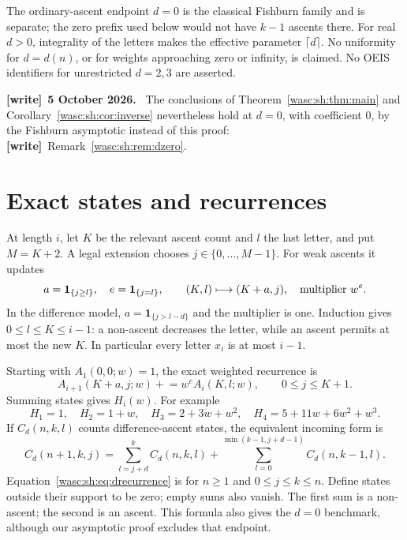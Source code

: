 \documentclass[11pt,a4paper]{article}
\theoremstyle{remark}\newtheorem{remark}[theorem]{Remark}
\newcommand{\ind}{\mathbf 1}\newcommand{\wasc}{\operatorname{wasc}}\newcommand{\dasc}{\operatorname{dasc}}
\numberwithin{equation}{section}
\newenvironment{writenote}[1][]{\par\smallskip\begingroup\small
 \noindent\textbf{[write]}\if\relax\detokenize{#1}\relax\else~\textbf{#1.}\fi\ }%
 {\par\endgroup\smallskip}
\newcommand{\wtag}{\textup{\textbf{[write]}}}
\begin{document}
The ordinary-ascent endpoint $d=0$ is the classical Fishburn family and is separate; the zero prefix used below would not have $k-1$ ascents there. For real $d>0$, integrality of the letters makes the effective parameter $\lceil d\rceil$. No uniformity for $d=d(n)$, or for weights approaching zero or infinity, is claimed. No OEIS identifiers for unrestricted $d=2,3$ are asserted.
\begin{writenote}[5 October 2026]
The conclusions of Theorem~\ref{wasc:sh:thm:main} and Corollary~\ref{wasc:sh:cor:inverse} nevertheless hold at $d=0$, with coefficient $0$, by the Fishburn asymptotic instead of this proof: \wtag\ Remark~\ref{wasc:sh:rem:dzero}.
\end{writenote}

\section{Exact states and recurrences}\label{wasc:sh:sec:states}
At length $i$, let $K$ be the relevant ascent count and $l$ the last letter, and put $M=K+2$. A legal extension chooses $j\in\{0,\ldots,M-1\}$. For weak ascents it updates
\begin{equation}\label{wasc:sh:eq:transition}
a=\ind_{\{j\ge l\}},\quad e=\ind_{\{j=l\}},\qquad
(K,l)\longmapsto(K+a,j),\quad\hbox{multiplier }w^e.
\end{equation}
In the difference model, $a=\ind_{\{j>l-d\}}$ and the multiplier is one. Induction gives $0\le l\le K\le i-1$: a non-ascent decreases the letter, while an ascent permits at most the new $K$. In particular every letter $x_i$ is at most $i-1$.

Starting with $A_1(0,0;w)=1$, the exact weighted recurrence is
\[
A_{i+1}(K+a,j;w)\mathrel{+}=w^e A_i(K,l;w),\qquad 0\le j\le K+1.
\]
Summing states gives $H_i(w)$. For example
\[
H_1=1,\quad H_2=1+w,\quad H_3=2+3w+w^2,\quad
H_4=5+11w+6w^2+w^3.
\]
If $C_d(n,k,l)$ counts difference-ascent states, the equivalent incoming form is
\begin{equation}\label{wasc:sh:eq:drecurrence}
C_d(n+1,k,j)=\sum_{l=j+d}^{k}C_d(n,k,l)
+\sum_{l=0}^{\min(k-1,j+d-1)}C_d(n,k-1,l).
\end{equation}
Equation~\eqref{wasc:sh:eq:drecurrence} is for $n\ge1$ and $0\le j\le k\le n$. Define states outside their support to be zero; empty sums also vanish. The first sum is a non-ascent; the second is an ascent. This formula also gives the $d=0$ benchmark, although our asymptotic proof excludes that endpoint.
\end{document}
